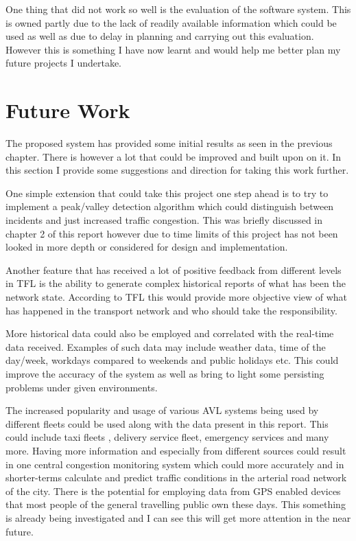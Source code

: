 One thing that did not work so well is the evaluation of the software system. This is owned partly due to the lack of readily available information which could be used as well as due to delay in planning and carrying out this evaluation. However this is something I have now learnt and would help me better plan my future projects I undertake.


\section{Future Work}
The proposed system has provided some initial results as seen in the previous chapter. There is however a lot that could be improved and built upon on it. In this section I provide some suggestions and direction for taking this work further.

One simple extension that could take this project one step ahead is to try to implement a peak/valley detection algorithm which could distinguish between incidents and just increased traffic congestion. This was briefly discussed in chapter 2 of this report however due to time limits of this project has not been looked in more depth or considered for design and implementation.

Another feature that has received a lot of positive feedback from different levels in TFL is the ability to generate complex historical reports of what has been the network state. According to TFL this would provide more objective view of what has happened in the transport network and who should take the responsibility. 

More historical data could also be employed and correlated with the real-time data received. Examples of such data may include weather data, time of the day/week, workdays compared to weekends and public holidays etc. This could improve the accuracy of the system as well as bring to light some persisting problems under given environments.

The increased popularity and usage of various AVL systems being used by different fleets could be used along with the data present in this report. This could include taxi fleets \cite{rahmani2010requirements}, delivery service fleet, emergency services and many more. Having more information and especially from different sources could result in one central congestion monitoring system which could more accurately and in shorter-terms calculate and predict traffic conditions in the arterial road network of the city. There is the potential for employing data from GPS enabled devices that most people of the general travelling public own these days. This something is already being investigated \cite{thiagarajan2010cooperative} and I can see this will get more attention in the near future.

